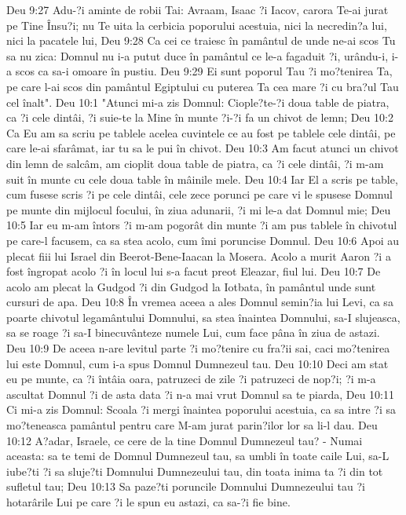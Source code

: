 Deu 9:27  Adu-?i aminte de robii Tai: Avraam, Isaac ?i Iacov, carora Te-ai jurat pe Tine Însu?i; nu Te uita la cerbicia poporului acestuia, nici la necredin?a lui, nici la pacatele lui,
Deu 9:28  Ca cei ce traiesc în pamântul de unde ne-ai scos Tu sa nu zica: Domnul nu i-a putut duce în pamântul ce le-a fagaduit ?i, urându-i, i-a scos ca sa-i omoare în pustiu.
Deu 9:29  Ei sunt poporul Tau ?i mo?tenirea Ta, pe care l-ai scos din pamântul Egiptului cu puterea Ta cea mare ?i cu bra?ul Tau cel înalt".
Deu 10:1  "Atunci mi-a zis Domnul: Ciople?te-?i doua table de piatra, ca ?i cele dintâi, ?i suie-te la Mine în munte ?i-?i fa un chivot de lemn;
Deu 10:2  Ca Eu am sa scriu pe tablele acelea cuvintele ce au fost pe tablele cele dintâi, pe care le-ai sfarâmat, iar tu sa le pui în chivot.
Deu 10:3  Am facut atunci un chivot din lemn de salcâm, am cioplit doua table de piatra, ca ?i cele dintâi, ?i m-am suit în munte cu cele doua table în mâinile mele.
Deu 10:4  Iar El a scris pe table, cum fusese scris ?i pe cele dintâi, cele zece porunci pe care vi le spusese Domnul pe munte din mijlocul focului, în ziua adunarii, ?i mi le-a dat Domnul mie;
Deu 10:5  Iar eu m-am întors ?i m-am pogorât din munte ?i am pus tablele în chivotul pe care-l facusem, ca sa stea acolo, cum îmi poruncise Domnul.
Deu 10:6  Apoi au plecat fiii lui Israel din Beerot-Bene-Iaacan la Mosera. Acolo a murit Aaron ?i a fost îngropat acolo ?i în locul lui s-a facut preot Eleazar, fiul lui.
Deu 10:7  De acolo am plecat la Gudgod ?i din Gudgod la Iotbata, în pamântul unde sunt cursuri de apa.
Deu 10:8  În vremea aceea a ales Domnul semin?ia lui Levi, ca sa poarte chivotul legamântului Domnului, sa stea înaintea Domnului, sa-I slujeasca, sa se roage ?i sa-I binecuvânteze numele Lui, cum face pâna în ziua de astazi.
Deu 10:9  De aceea n-are levitul parte ?i mo?tenire cu fra?ii sai, caci mo?tenirea lui este Domnul, cum i-a spus Domnul Dumnezeul tau.
Deu 10:10  Deci am stat eu pe munte, ca ?i întâia oara, patruzeci de zile ?i patruzeci de nop?i; ?i m-a ascultat Domnul ?i de asta data ?i n-a mai vrut Domnul sa te piarda,
Deu 10:11  Ci mi-a zis Domnul: Scoala ?i mergi înaintea poporului acestuia, ca sa intre ?i sa mo?teneasca pamântul pentru care M-am jurat parin?ilor lor sa li-l dau.
Deu 10:12  A?adar, Israele, ce cere de la tine Domnul Dumnezeul tau? - Numai aceasta: sa te temi de Domnul Dumnezeul tau, sa umbli în toate caile Lui, sa-L iube?ti ?i sa sluje?ti Domnului Dumnezeului tau, din toata inima ta ?i din tot sufletul tau;
Deu 10:13  Sa paze?ti poruncile Domnului Dumnezeului tau ?i hotarârile Lui pe care ?i le spun eu astazi, ca sa-?i fie bine.
